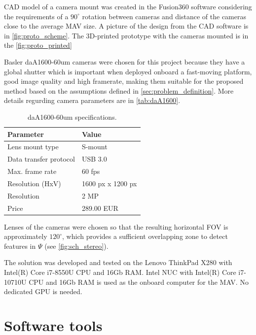 CAD model of a camera mount was created in the Fusion360 software considering the requirements of a $90^\circ$ rotation between cameras and distance of the cameras close to the average MAV size.
A picture of the design from the CAD software is in \autoref{fig:proto_scheme}.
The 3D-printed prototype with the cameras mounted is in the \autoref{fig:proto_printed}

Basler daA1600-60um cameras were chosen for this project because they have a global shutter which is important when deployed onboard a fast-moving platform, good image quality and high framerate, making them suitable for the proposed method based on the assumptions defined in \autoref{sec:problem_definition}. 
More details regurding camera parameters are in \autoref{tab:daA1600}.

\begin{table}
    \begin{center}
      \begin{tabular}{ l l }
      \hline
      Parameter              & Value             \\ \hline
      Lens mount type        & S-mount           \\
      Data transfer protocol & USB 3.0           \\
      Max. frame rate        & 60 fps            \\
      Resolution (HxV)       & 1600 px x 1200 px \\
      Resolution             & 2 MP              \\
      Price                  & 289.00 EUR        \\ \hline
      \end{tabular}
    \end{center}
    \caption{daA1600-60um specifications.}
    \label{tab:daA1600}
\end{table}

Lenses of the cameras were chosen so that the resulting horizontal FOV is approximately $120^\circ$, which provides a sufficient overlapping zone to detect features in $\Psi$ (see \autoref{fig:sch_stereo}).

The solution was developed and tested on the Lenovo ThinkPad X280 with Intel(R) Core i7-8550U CPU and 16Gb RAM.
Intel NUC with Intel(R) Core i7-10710U CPU and 16Gb RAM is used as the onboard computer for the MAV.
No dedicated GPU is needed.

\section{Software tools}
\label{sec:impl_software}

